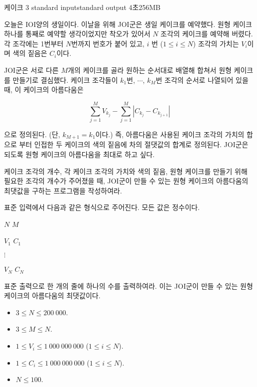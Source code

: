\begin{problem}{케이크 3}
	{standard input}{standard output}
	{4초}{256MB}{}
	
	오늘은 IOI양의 생일이다. 이날을 위해 JOI군은 생일 케이크를 예약했다. 원형 케이크 하나를 통째로 예약할 생각이었지만 착오가 있어서 $N$ 조각의 케이크를 예약해 버렸다. 각 조각에는 1번부터 $N$번까지 번호가 붙어 있고, $i$ 번 ($1 \le i \le N$) 조각의 가치는 $V_i$이며 색의 짙음은 $C_i$이다.
	
	JOI군은 서로 다른 $M$개의 케이크를 골라 원하는 순서대로 배열해 합쳐서 원형 케이크를 만들기로 결심했다. 케이크 조각들이 $k_1$번, $\cdots$, $k_M$번 조각의 순서로 나열되어 있을 때, 이 케이크의 아름다움은 
	
	$$
	\sum_{j=1}^{M} {V_{k_j}} - \sum_{j=1}^{M} {\left| C_{k_j} - C_{k_{j+1}}\right|}
	$$
	
	으로 정의된다. (단, $k_{M+1} = k_1$이다.) 즉, 아름다움은 사용된 케이크 조각의 가치의 합으로  부터 인접한 두 케이크의 색의 짙음에 차의 절댓값의 합계로 정의된다. JOI군은 되도록 원형 케이크의 아름다움을 최대로 하고 싶다.
	
	케이크 조각의 개수, 각 케이크 조각의 가치와 색의 짙음, 원형 케이크를 만들기 위해 필요한 조각의 개수가 주어졌을 때, JOI군이 만들 수 있는 원형 케이크의 아름다움의 최댓값을 구하는 프로그램을 작성하여라.
	
	\InputFile
	
	표준 입력에서 다음과 같은 형식으로 주어진다. 모든 값은 정수이다.
	
	$N$ $M$

	$V_1$ $C_1$
	
	$\vdots$
	
	$V_N$ $C_N$
	
	\OutputFile
	
	표준 출력으로 한 개의 줄에 하나의 수를 출력하여라. 이는 JOI군이 만들 수 있는 원형 케이크의 아름다움의 최댓값이다.
		
	\Constraints
	
	\begin{itemize}
		\item $3 \le N \le 200\ 000$.
		\item $3 \le M \le N$.
		\item $1 \le V_i \le 1\ 000\ 000\ 000$ ($1 \le i \le N$).
		\item $1 \le C_i \le 1\ 000\ 000\ 000$ ($1 \le i \le N$).
	\end{itemize}
	
	
	\begin{itemize}
		\item $N \le 100$.
	\end{itemize}



\end{problem}

